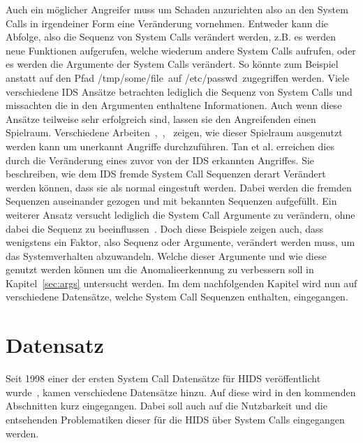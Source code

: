         Auch ein möglicher Angreifer muss um Schaden anzurichten also an den System Calls in irgendeiner Form eine Veränderung vornehmen.
        Entweder kann die Abfolge, also die Sequenz von System Calls verändert werden, z.B. es werden neue Funktionen aufgerufen, welche wiederum andere System Calls aufrufen,
        oder es werden die Argumente der System Calls verändert.
        So könnte zum Beispiel anstatt auf den Pfad \glqq /tmp/some/file\grqq \ auf \glqq /etc/passwd\grqq \ zugegriffen werden. 
        Viele verschiedene IDS Ansätze betrachten lediglich die Sequenz von System Calls und missachten die in den Argumenten enthaltene Informationen.
        Auch wenn diese Ansätze teilweise sehr erfolgreich sind, lassen sie den Angreifenden einen Spielraum.
        Verschiedene Arbeiten~\cite{Syscallseqexploit1},~\cite{Syscallseqexploit2},~\cite{Syscallseqexploit3} zeigen, wie dieser Spielraum ausgenutzt werden kann um unerkannt Angriffe durchzuführen. 
        Tan et al. \cite{Syscallseqexploit3} erreichen dies durch die Veränderung eines zuvor von der IDS erkannten Angriffes.
        Sie beschreiben, wie dem IDS fremde System Call Sequenzen derart Verändert werden können, dass sie als normal eingestuft werden.
        Dabei werden die fremden Sequenzen auseinander gezogen und mit bekannten Sequenzen aufgefüllt. 
        Ein weiterer Ansatz versucht lediglich die System Call Argumente zu verändern, ohne dabei die Sequenz zu beeinflussen~\cite{Syscallseqexploit1}.
        Doch diese Beispiele zeigen auch, dass wenigstens ein Faktor, also Sequenz oder Argumente, verändert werden muss, um das Systemverhalten abzuwandeln.
        Welche dieser Argumente und wie diese genutzt werden können um die Anomalieerkennung zu verbessern soll in Kapitel~\ref{sec:args} untersucht werden.
        Im dem nachfolgenden Kapitel wird nun auf verschiedene Datensätze, welche System Call Sequenzen enthalten, eingegangen.

    \section{Datensatz}
    \label{sec:Datensatz}
        Seit 1998 einer der ersten System Call Datensätze für HIDS veröffentlicht wurde~\cite{DARPA},
        kamen verschiedene Datensätze hinzu.
        Auf diese wird in den kommenden Abschnitten kurz eingegangen.
        Dabei soll auch auf die Nutzbarkeit und die entsehenden Problematiken dieser für die HIDS über System Calls eingegangen werden.


